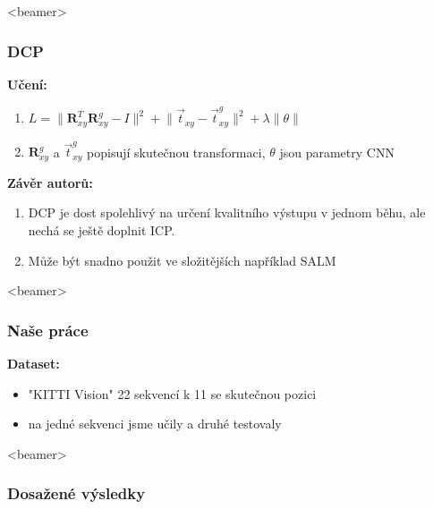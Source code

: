 \documentclass[t]{beamer}
\DeclareMathOperator*{\softmax}{softmax}
\newcommand{\norm}[1]{\lVert #1 \rVert}
\begin{document}
\begin{frame}<beamer>
  \frametitle{DCP}
  \textbf{Učení:}
  \begin{enumerate}
   \item $\displaystyle L=\norm{\textbf{R}_{xy}^T\textbf{R}_{xy}^g-I}^2 + \norm{\vec{t}_{xy}-\vec{t}_{xy}^g}^2+\lambda \norm{\theta}$
   \item $\textbf{R}_{xy}^g$ a $\vec{t}_{xy}^g$ popisují skutečnou transformaci, $\theta$ jsou parametry CNN
	\end{enumerate} 
	\textbf{Závěr autorů:}
	\begin{enumerate}  
    \item DCP je dost spolehlivý na určení kvalitního výstupu v jednom běhu, ale nechá se ještě doplnit ICP.
   \item Může být snadno použit ve složitějších například SALM
  \end{enumerate}  
\end{frame}


\begin{frame}<beamer>
  \frametitle{Naše práce}
  \textbf{Dataset:}
  \begin{itemize}
 	 \item "KITTI Vision"  22 sekvencí k 11 se skutečnou pozici
   \item na jedné sekvenci jsme učily a druhé testovaly
	\end{itemize} 
\end{frame}

\begin{frame}<beamer>
  \frametitle{Dosažené výsledky}
\end{frame}
\end{document}

